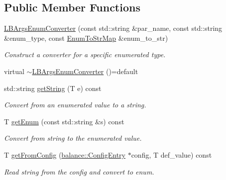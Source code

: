 \subsection*{Public Member Functions}
\begin{DoxyCompactItemize}
\item 
\hyperlink{structvt_1_1vrt_1_1collection_1_1balance_1_1_l_b_args_enum_converter_a38fffccf8165fc8b91f88acd69c85194}{L\+B\+Args\+Enum\+Converter} (const std\+::string \&par\+\_\+name, const std\+::string \&enum\+\_\+type, const \hyperlink{structvt_1_1vrt_1_1collection_1_1balance_1_1_l_b_args_enum_converter_ab4e2b0c525c1ea76f18f2ff45733f3c4}{Enum\+To\+Str\+Map} \&enum\+\_\+to\+\_\+str)
\begin{DoxyCompactList}\small\item\em Construct a converter for a specific enumerated type. \end{DoxyCompactList}\item 
virtual \hyperlink{structvt_1_1vrt_1_1collection_1_1balance_1_1_l_b_args_enum_converter_aa971f742159d754565c8239f4746a459}{$\sim$\+L\+B\+Args\+Enum\+Converter} ()=default
\item 
std\+::string \hyperlink{structvt_1_1vrt_1_1collection_1_1balance_1_1_l_b_args_enum_converter_a6080061d0da724543e9f039316176a0a}{get\+String} (T e) const
\begin{DoxyCompactList}\small\item\em Convert from an enumerated value to a string. \end{DoxyCompactList}\item 
T \hyperlink{structvt_1_1vrt_1_1collection_1_1balance_1_1_l_b_args_enum_converter_aea2a93bc866e73a7d39d4b858d0738d3}{get\+Enum} (const std\+::string \&s) const
\begin{DoxyCompactList}\small\item\em Convert from string to the enumerated value. \end{DoxyCompactList}\item 
T \hyperlink{structvt_1_1vrt_1_1collection_1_1balance_1_1_l_b_args_enum_converter_a9297f9943265a526b6790ee6e4b115da}{get\+From\+Config} (\hyperlink{structvt_1_1vrt_1_1collection_1_1balance_1_1_config_entry}{balance\+::\+Config\+Entry} $\ast$config, T def\+\_\+value) const
\begin{DoxyCompactList}\small\item\em Read string from the config and convert to enum. \end{DoxyCompactList}\end{DoxyCompactItemize}
